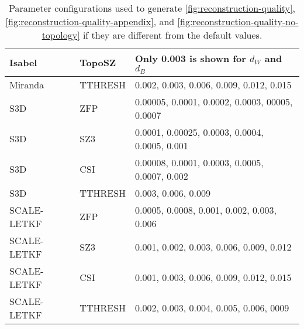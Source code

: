 \begin{table}[!ht]
{\begin{tabular}{ll|l}
Isabel                                                   & TopoSZ                                                    & Only 0.003 is shown for $d_W$ and $d_B$                                                                                      \\ \hline
Miranda                                                  & TTHRESH                                                   & 0.002, 0.003, 0.006, 0.009, 0.012, 0.015                                                                                     \\ \hline
S3D                                                      & ZFP                                                       & 0.00005, 0.0001, 0.0002, 0.0003, 00005, 0.0007                                                                               \\
S3D                                                      & SZ3                                                       & 0.0001, 0.00025, 0.0003, 0.0004, 0.0005, 0.001                                                                               \\
S3D                                                      & CSI                                                       & 0.00008, 0.0001, 0.0003, 0.0005, 0.0007, 0.002                                                                               \\
S3D                                                      & TTHRESH                                                   & 0.003, 0.006, 0.009                                                                                                          \\ \hline
SCALE-LETKF                                              & ZFP                                                       & 0.0005, 0.0008, 0.001, 0.002, 0.003, 0.006                                                                                   \\
SCALE-LETKF                                              & SZ3                                                       & 0.001, 0.002, 0.003, 0.006, 0.009, 0.012                                                                                     \\
SCALE-LETKF                                              & CSI                                                       & 0.001, 0.003, 0.006, 0.009, 0.012, 0.015                                                                                     \\
SCALE-LETKF                                              & TTHRESH                                                   & 0.002, 0.003, 0.004, 0.005, 0.006, 0009                                                                                      \\ \hline
\end{tabular}}
\vspace{-3mm}
\caption{Parameter configurations used to generate \cref{fig:reconstruction-quality}, \cref{fig:reconstruction-quality-appendix}, and \cref{fig:reconstruction-quality-no-topology} if they are different from the default values.}
\label{tab:odd-parameter-configurations}
\end{table}